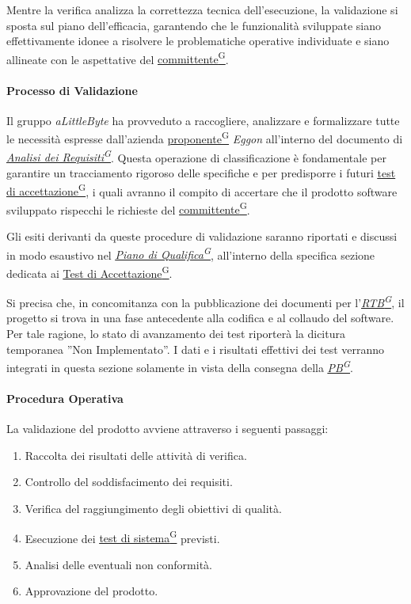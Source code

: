 \documentclass[a4paper,12pt]{article}
\providecommand{\glslink}[2]{\href{https://alittlebyte-19.github.io/Documentazione/glossario.html\#gls-#1}{\underline{#2}\textsuperscript{\scriptsize G}}}
\begin{document}
Mentre la verifica analizza la correttezza tecnica dell'esecuzione, la validazione si sposta sul piano dell'efficacia, garantendo che le funzionalità sviluppate siano effettivamente idonee a risolvere le problematiche operative individuate e siano allineate con le aspettative del \glslink{committente-proponente}{committente}.

\paragraph{Processo di Validazione}
Il gruppo \textit{aLittleByte} ha provveduto a raccogliere, analizzare e formalizzare tutte le necessità espresse dall'azienda \glslink{committente-proponente}{proponente} \textit{Eggon} all'interno del documento di \textit{\glslink{analisi-dei-requisiti-adr}{Analisi dei Requisiti}}. Questa operazione di classificazione è fondamentale per garantire un tracciamento rigoroso delle specifiche e per predisporre i futuri \glslink{test-di-accettazione}{test di accettazione}, i quali avranno il compito di accertare che il prodotto software sviluppato rispecchi le richieste del \glslink{committente-proponente}{committente}.

Gli esiti derivanti da queste procedure di validazione saranno riportati e discussi in modo esaustivo nel \textit{\glslink{piano-di-qualifica}{Piano di Qualifica}}, all'interno della specifica sezione dedicata ai \glslink{test-di-accettazione}{Test di Accettazione}.

Si precisa che, in concomitanza con la pubblicazione dei documenti per l'\textit{\glslink{rtb-requirements-and-technology-baseline}{RTB}}, il progetto si trova in una fase antecedente alla codifica e al collaudo del software. Per tale ragione, lo stato di avanzamento dei test riporterà la dicitura temporanea ''Non Implementato''. I dati e i risultati effettivi dei test verranno integrati in questa sezione solamente in vista della consegna della \textit{\glslink{pb-product-baseline}{PB}}.

\paragraph{Procedura Operativa}
La validazione del prodotto avviene attraverso i seguenti passaggi:

\begin{enumerate}
    \item Raccolta dei risultati delle attività di verifica.
    \item Controllo del soddisfacimento dei requisiti.
    \item Verifica del raggiungimento degli obiettivi di qualità.
    \item Esecuzione dei \glslink{test-di-sistema}{test di sistema} previsti.
    \item Analisi delle eventuali non conformità.
    \item Approvazione del prodotto.
\end{enumerate}
\end{document}
